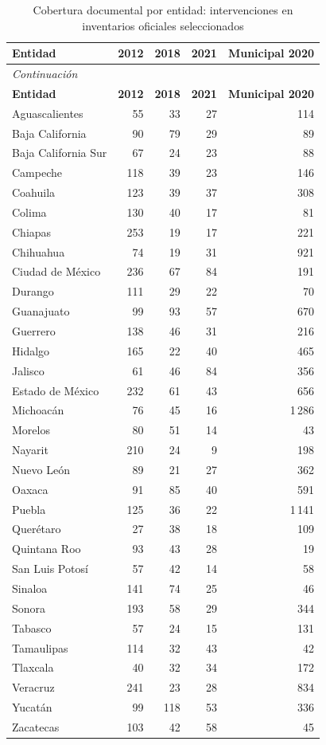 \begingroup\small
\setlength{\tabcolsep}{4pt}
\begin{longtable}{lrrrr}
\caption{Cobertura documental por entidad: intervenciones en inventarios oficiales seleccionados}\label{tab:catalogo-cobertura}\\
\toprule
\textbf{Entidad} & \textbf{2012} & \textbf{2018} & \textbf{2021} & \textbf{Municipal 2020} \\
\midrule\endfirsthead
\multicolumn{5}{l}{\textit{Continuación}}\\
\toprule
\textbf{Entidad} & \textbf{2012} & \textbf{2018} & \textbf{2021} & \textbf{Municipal 2020} \\
\midrule\endhead
\bottomrule\endfoot
Aguascalientes & 55 & 33 & 27 & 114 \\
Baja California & 90 & 79 & 29 & 89 \\
Baja California Sur & 67 & 24 & 23 & 88 \\
Campeche & 118 & 39 & 23 & 146 \\
Coahuila & 123 & 39 & 37 & 308 \\
Colima & 130 & 40 & 17 & 81 \\
Chiapas & 253 & 19 & 17 & 221 \\
Chihuahua & 74 & 19 & 31 & 921 \\
Ciudad de México & 236 & 67 & 84 & 191 \\
Durango & 111 & 29 & 22 & 70 \\
Guanajuato & 99 & 93 & 57 & 670 \\
Guerrero & 138 & 46 & 31 & 216 \\
Hidalgo & 165 & 22 & 40 & 465 \\
Jalisco & 61 & 46 & 84 & 356 \\
Estado de México & 232 & 61 & 43 & 656 \\
Michoacán & 76 & 45 & 16 & 1\,286 \\
Morelos & 80 & 51 & 14 & 43 \\
Nayarit & 210 & 24 & 9 & 198 \\
Nuevo León & 89 & 21 & 27 & 362 \\
Oaxaca & 91 & 85 & 40 & 591 \\
Puebla & 125 & 36 & 22 & 1\,141 \\
Querétaro & 27 & 38 & 18 & 109 \\
Quintana Roo & 93 & 43 & 28 & 19 \\
San Luis Potosí & 57 & 42 & 14 & 58 \\
Sinaloa & 141 & 74 & 25 & 46 \\
Sonora & 193 & 58 & 29 & 344 \\
Tabasco & 57 & 24 & 15 & 131 \\
Tamaulipas & 114 & 32 & 43 & 42 \\
Tlaxcala & 40 & 32 & 34 & 172 \\
Veracruz & 241 & 23 & 28 & 834 \\
Yucatán & 99 & 118 & 53 & 336 \\
Zacatecas & 103 & 42 & 58 & 45 \\
\end{longtable}
